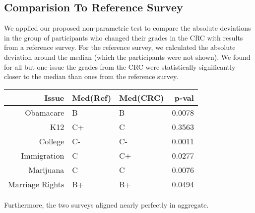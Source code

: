 \subsection{Comparision To Reference Survey}
We applied our proposed non-parametric test to compare the absolute deviations in the group of participants who changed their grades in the CRC with results from a reference survey.
For the reference survey, we calculated the absolute deviation around the median (which the participants were not shown).
We found for all but one issue the grades from the CRC were statistically significantly closer to the median than ones from the reference survey.

\begin{tabular}[!ht] { r | l | l | r}
\label{ref-1}
  Issue & Med(Ref) & Med(CRC) & p-val \\
  \hline
  \hline
  Obamacare &  B & B & 0.0078\\
  \hline
  K12 & C+ & C & 0.3563\\
  \hline
  College & C- & C- & 0.0011\\
  \hline
  Immigration & C & C+ & 0.0277\\
  \hline
  Marijuana & C & C & 0.0076\\
  \hline
  Marriage Rights & B+ & B+ & 0.0494 \\
\end{tabular}

Furthermore, the two surveys aligned nearly perfectly in aggregate.
